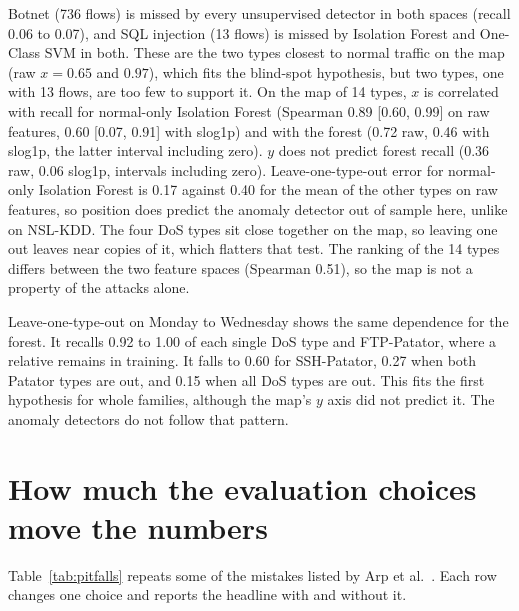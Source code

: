 \documentclass[10pt]{article}
\begin{document}
Botnet (736 flows) is missed by every unsupervised detector in both spaces (recall 0.06 to 0.07), and SQL
injection (13 flows) is missed by Isolation Forest and One-Class SVM in both. These are the two types closest to
normal traffic on the map (raw $x = 0.65$ and $0.97$), which fits the blind-spot hypothesis, but two types,
one with 13 flows, are too few to support it. On the map of 14 types, $x$ is correlated with recall for normal-only
Isolation Forest (Spearman 0.89 [0.60, 0.99] on raw features, 0.60 [0.07, 0.91] with slog1p) and with the forest
(0.72 raw, 0.46 with slog1p, the latter interval including zero). $y$ does not predict forest recall (0.36 raw, 0.06
slog1p, intervals including zero). Leave-one-type-out error for normal-only Isolation Forest is 0.17 against 0.40
for the mean of the other types on raw features, so position does predict the anomaly detector out of sample here, unlike on NSL-KDD. The four DoS types sit close together on the map, so leaving one out leaves near copies of
it, which flatters that test. The ranking of the 14 types differs between the two feature spaces
(Spearman 0.51), so the map is not a property of the attacks alone.

Leave-one-type-out on Monday to Wednesday shows the same dependence for the forest. It recalls 0.92 to 1.00 of each single DoS type
and FTP-Patator, where a relative remains in training. It falls to 0.60 for SSH-Patator, 0.27 when both Patator
types are out, and 0.15 when all DoS types are out. This fits the first hypothesis for whole families, although
the map's $y$ axis did not predict it. The anomaly detectors do not follow that pattern.

\section{How much the evaluation choices move the numbers}

Table~\ref{tab:pitfalls} repeats some of the mistakes listed by Arp et al.\ \cite{arp2022}. Each row changes one
choice and reports the headline with and without it.
\end{document}

